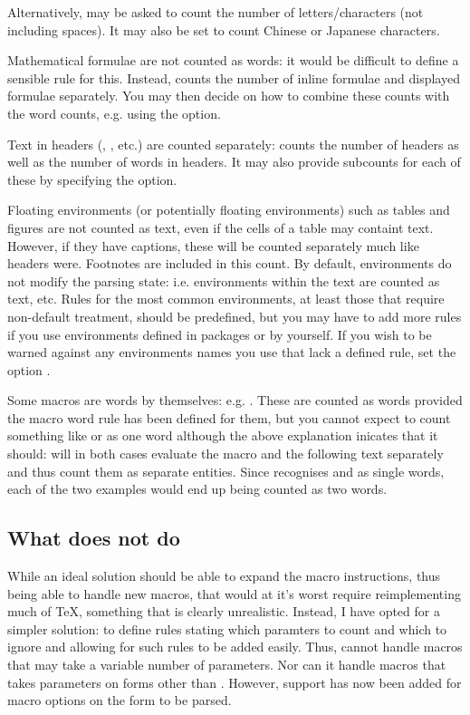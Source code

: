 \documentclass{article}
\begin{document}
Alternatively, \TeXcount{} may be asked to count the number of letters/characters (not including spaces). It may also be set to count Chinese or Japanese characters.

Mathematical formulae are not counted as words: it would be difficult to define a sensible rule for this. Instead, \TeXcount{} counts the number of inline formulae and displayed formulae separately. You may then decide on how to combine these counts with the word counts, e.g. using the  option.

Text in headers (, , etc.) are counted separately: \TeXcount{} counts the number of headers as well as the number of words in headers. It may also provide subcounts for each of these by specifying the  option.

Floating environments (or potentially floating environments) such as tables and figures are not counted as text, even if the cells of a table may containt text. However, if they have captions, these will be counted separately much like headers were. Footnotes are included in this count. By default, environments do not modify the parsing state: i.e. environments within the text are counted as text, etc. Rules for the most common environments, at least those that require non-default treatment, should be predefined, but you may have to add more rules if you use environments defined in packages or by yourself. If you wish to be warned against any environments names you use that lack a defined rule, set the option .

Some macros are words by themselves: e.g. . These are counted as words provided the macro word rule has been defined for them, but you cannot expect \TeXcount{} to count something like  or  as one word although the above explanation inicates that it should: \TeXcount{} will in both cases evaluate the macro and the following text separately and thus count them as separate entities. Since \TeXcount{} recognises  and  as single words, each of the two examples would end up being counted as two words.


\subsection{What \TeXcount{} does not do}

While an ideal solution should be able to expand the macro instructions, thus being able to handle new macros, that would at it's worst require reimplementing much of \TeX{}, something that is clearly unrealistic. Instead, I have opted for a simpler solution: to define rules stating which paramters to count and which to ignore and allowing for such rules to be added easily. Thus, \TeXcount{} cannot handle macros that may take a variable number of parameters. Nor can it handle macros that takes parameters on forms other than . However, support has now been added for macro options on the form \code{[\ldots]} to be parsed.
\end{document}
